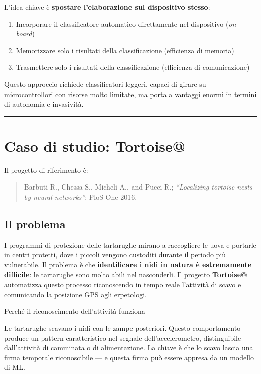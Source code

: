 \documentclass[
  italian,
  openany]{book}
\providecommand{\tightlist}{%
  \setlength{\itemsep}{0pt}\setlength{\parskip}{0pt}}
\begin{document}
L'idea chiave è \textbf{spostare l'elaborazione sul dispositivo stesso}:

\begin{enumerate}
\def\labelenumi{\arabic{enumi}.}
\tightlist
\item
  Incorporare il classificatore automatico direttamente nel dispositivo
  (\emph{on-board})
\item
  Memorizzare solo i risultati della classificazione (efficienza di
  memoria)
\item
  Trasmettere solo i risultati della classificazione (efficienza di
  comunicazione)
\end{enumerate}

Questo approccio richiede classificatori leggeri, capaci di girare su
microcontrollori con risorse molto limitate, ma porta a vantaggi enormi
in termini di autonomia e invasività.

\begin{center}\rule{0.5\linewidth}{0.5pt}\end{center}

\section{Caso di studio: Tortoise@}\label{caso-di-studio-tortoise}

Il progetto di riferimento è:

\begin{quote}
Barbuti R., Chessa S., Micheli A., and Pucci R.; \emph{``Localizing
tortoise nests by neural networks''}; PloS One 2016.
\end{quote}

\subsection{Il problema}\label{il-problema}

I programmi di protezione delle tartarughe mirano a raccogliere le uova
e portarle in centri protetti, dove i piccoli vengono custoditi durante
il periodo più vulnerabile. Il problema è che \textbf{identificare i
nidi in natura è estremamente difficile}: le tartarughe sono molto abili
nel nasconderli. Il progetto \textbf{Tortoise@} automatizza questo
processo riconoscendo in tempo reale l'attività di scavo e comunicando
la posizione GPS agli erpetologi.

\begin{callouttip}{Perché il riconoscimento dell’attività funziona}

Le tartarughe scavano i nidi con le zampe posteriori. Questo
comportamento produce un pattern caratteristico nel segnale
dell'accelerometro, distinguibile dall'attività di camminata o di
alimentazione. La chiave è che lo scavo lascia una firma temporale
riconoscibile --- e questa firma può essere appresa da un modello di ML.

\end{callouttip}
\end{document}
